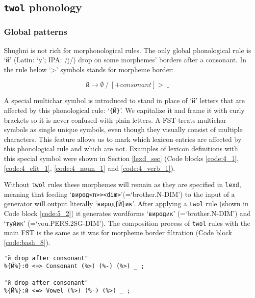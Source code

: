 \subsection{\texttt{twol} phonology}
\subsubsection{Global patterns}
Shughni is not rich for morphonological rules. The only global phonological rule is `й' (Latin: `y'; IPA: /j/) drop on some morphemes' borders after a consonant. In the rule below `>' symbols stands for morpheme border:

\[
й \rightarrow \emptyset 
\ /\ 
[+consonant]
>
\ \_
\]

A special multichar symbol is introduced to stand in place of `й' letters that are affected by this phonological rule: `\texttt{\{Й\}}'. We capitalize it and frame it with curly brackets so it is never confused with plain letters. A FST treats multichar symbols as single unique symbols, even though they visually consist of multiple characters. This feature allows us to mark which lexicon entries are affected by this phonological rule and which are not. Examples of lexicon definitions with this special symbol were shown in Section \ref{lexd_sec} (Code blocks \ref{code:4_1}, \ref{code:4_clit_1}, \ref{code:4_noun_1} and \ref{code:4_verb_1}).

Without \texttt{twol} rules these morphemes will remain as they are specified in \texttt{lexd}, meaning that feeding `\texttt{вирод<n>><dim>}'(=`brother.N-DIM') to the input of a generator will output literally `\texttt{вирод\{Й\}ик}'. After applying a \texttt{twol} rule (shown in Code block \ref{code:5_2}) it generates wordforms `\texttt{виродик}' (=`brother.N-DIM') and `\texttt{туйик}' (=`you.PERS.2SG-DIM'). The composition process of \texttt{twol} rules with the main FST is the same as it was for morpheme border filtration (Code block \ref{code:bash_8}).

\begin{code_frame}[float,floatplacement=!h]
    \begin{footnotesize}\codespacing
    \begin{verbatim}
"й drop after consonant"
%{Й%}:0 <=> Consonant (%>) (%-) (%>) _ ;

"й drop after consonant"
%{Й%}:й <=> Vowel (%>) (%-) (%>) _ ;
    \end{verbatim}
    \end{footnotesize}
    \tcblower
    \label{code:5_2}
\end{code_frame}


